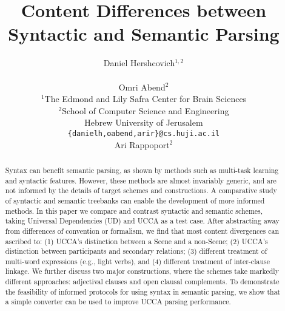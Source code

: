 \documentclass[11pt,a4paper]{article}
\title{Content Differences between Syntactic and Semantic Parsing}
\author{Daniel Hershcovich$^{1,2}$ \\
  \\\And
  Omri Abend$^2$ \\
  $^1$The Edmond and Lily Safra Center for Brain Sciences \\
  $^2$School of Computer Science and Engineering \\
  Hebrew University of Jerusalem \\
  \texttt{\{danielh,oabend,arir\}@cs.huji.ac.il}
  \\\And
  Ari Rappoport$^2$
}
\date{}
\begin{document}
\maketitle

\begin{abstract}
  Syntax can benefit semantic parsing,
  as shown by methods such as multi-task learning and syntactic features.
  However, these methods are almost invariably generic,
  and are not informed by the details of target schemes and constructions.
  A comparative study of syntactic and semantic treebanks can enable
  the development of more informed methods.
  In this paper we compare and contrast syntactic and semantic schemes,
  taking Universal Dependencies (UD) and UCCA as a test case.
  After abstracting away from differences of convention or formalism,
  we find that most content divergences can ascribed to: 
  (1) UCCA's distinction between a Scene and a non-Scene; %
  (2) UCCA's distinction between participants and secondary relations; %
  (3) different treatment of multi-word expressions (e.g., light verbs), and
  (4) different treatment of inter-clause linkage.
  We further discuss two major constructions, where the schemes take markedly different approaches:
  adjectival clauses and open clausal complements.
  To demonstrate the feasibility of informed protocols for using syntax in semantic parsing,
  we show that a simple converter can be used to improve UCCA parsing performance.
\end{abstract}







\end{document}

